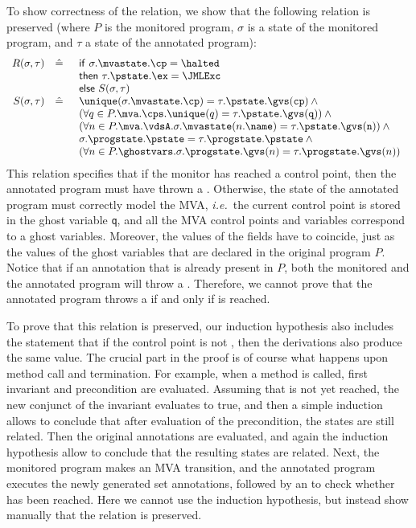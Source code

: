 To show correctness of the relation, we show that the following
relation is preserved (where \(P\) is the monitored program,
\(\sigma\) is a state of the monitored program, and \(\tau\) a state
of the annotated program):
\[
\begin{array}{rcl}
R(\sigma, \tau) & \hat=  &
\begin{array}[t]{l}
\mathsf{if\ }\sigma.\mvastate.\cp = \halted\\
\mathsf{then\ }\tau.\pstate.\ex = \JMLExc\\
\mathsf{else\ }S(\sigma, \tau)
\end{array}\\
S(\sigma, \tau) & \hat= &
\begin{array}[t]{l}
\unique(\sigma.\mvastate.\cp) = \tau.\pstate.\gvs(\texttt{cp}) \:\wedge\\
(\forall q \in P.\mva.\cps. \unique(q) =
\tau.\pstate.\gvs(\texttt{q})) \:\wedge\\
(\forall n \in P.\mva.\vdsA. \sigma.\mvastate(n.\name) = 
                             \tau.\pstate.\gvs(\texttt{n})) \:\wedge\\
\sigma.\progstate.\pstate = \tau.\progstate.\pstate \:\wedge\\
(\forall n \in P.\ghostvars. \sigma.\progstate.\gvs(n) =
\tau.\progstate.\gvs(n))
\end{array}
\end{array}
\]
This relation specifies that if the monitor has reached a \halted
control point, then the annotated program must have thrown a
\JMLExc. Otherwise, the state of the annotated program must correctly
model the MVA, \emph{i.e.}\ the current control point is stored in the
ghost variable \texttt{q}, and all the MVA control points and
variables correspond to a ghost variables. Moreover, the values of the
fields have to coincide, just as the values of the ghost variables
that are declared in the original program \(P\). Notice that if an
annotation that is already present in \(P\), both the monitored and
the annotated program will throw a \JMLExc. Therefore, we cannot prove
that the annotated program throws a \JMLExc if and only if \halted is
reached. 

To prove that this relation is preserved, our induction hypothesis
also includes the statement that if the control point is not \halted,
then the derivations also produce the same value. The crucial part in
the proof is of course what happens upon method call and
termination. For example, when a method is called, first invariant and
precondition are evaluated. Assuming that \halted is not yet reached,
the new conjunct of the invariant evaluates to true, and then a simple
induction allows to conclude that after evaluation of the
precondition, the states are still related. Then the original \preset
annotations are evaluated, and again the induction hypothesis allow to
conclude that the resulting states are related. Next, the monitored
program makes an MVA transition, and the annotated program executes
the newly generated set annotations, followed by an \Assert to check
whether \halted has been reached. Here we cannot use the induction
hypothesis, but instead show manually that the relation is preserved. 

